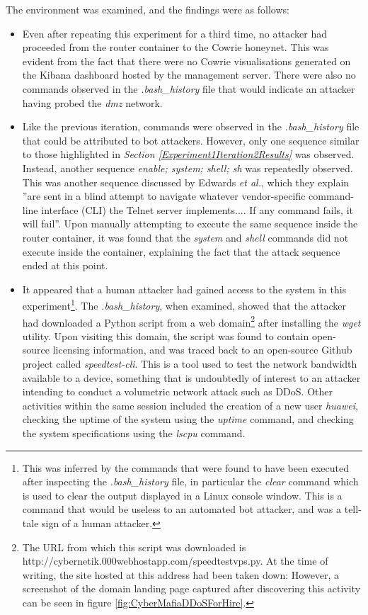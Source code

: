 The environment was examined, and the findings were as follows:
\begin{itemize}
\item Even after repeating this experiment for a third time, no attacker had proceeded from the router container to the Cowrie honeynet. This was evident from the fact that there were no Cowrie visualisations generated on the Kibana dashboard hosted by the management server. There were also no commands observed in the \textit{.bash\_history} file that would indicate an attacker having probed the \textit{dmz} network.
\item Like the previous iteration, commands were observed in the \textit{.bash\_history} file that could be attributed to bot attackers. However, only one sequence similar to those highlighted in \textit{Section \ref{Experiment1Iteration2Results}} was observed. Instead, another sequence \textit{enable;  system;  shell;  sh} was repeatedly observed. This was another sequence discussed by Edwards \textit{et al.}, which they explain ''are sent in a blind attempt to navigate whatever vendor-specific command-line interface (CLI) the Telnet server implements.... If any command fails, it will fail''. \cite{HajimeMysteriousBotnet} Upon manually attempting to execute the same sequence inside the router container, it was found that the \textit{system} and \textit{shell} commands did not execute inside the container, explaining the fact that the attack sequence ended at this point.
\item It appeared that a human attacker had gained access to the system in this experiment\footnote{This was inferred by the commands that were found to have been executed after inspecting the \textit{.bash\_history} file, in particular the \textit{clear} command which is used to clear the output displayed in a Linux console window. This is a command that would be useless to an automated bot attacker, and was a tell-tale sign of a human attacker.}. The \textit{.bash\_history}, when examined, showed that the attacker had downloaded a Python script from a web domain\footnote{The URL from which this script was downloaded is http://cybernetik.000webhostapp.com/speedtestvps.py. At the time of writing, the site hosted at this address had been taken down: However, a screenshot of the domain landing page captured after discovering this activity can be seen in figure \ref{fig:CyberMafiaDDoSForHire}. } after installing the \textit{wget} utility. Upon visiting this domain, the script was found to contain open-source licensing information, and was traced back to an open-source Github project called \textit{speedtest-cli}. \cite{SpeedtestCLITool} This is a tool used to test the network bandwidth available to a device, something that is undoubtedly of interest to an attacker intending to conduct a volumetric network attack such as DDoS. Other activities within the same session included the creation of a new user \textit{huawei}, checking the uptime of the system using the \textit{uptime} command, and checking the system specifications using the \textit{lscpu} command.
\end{itemize}

